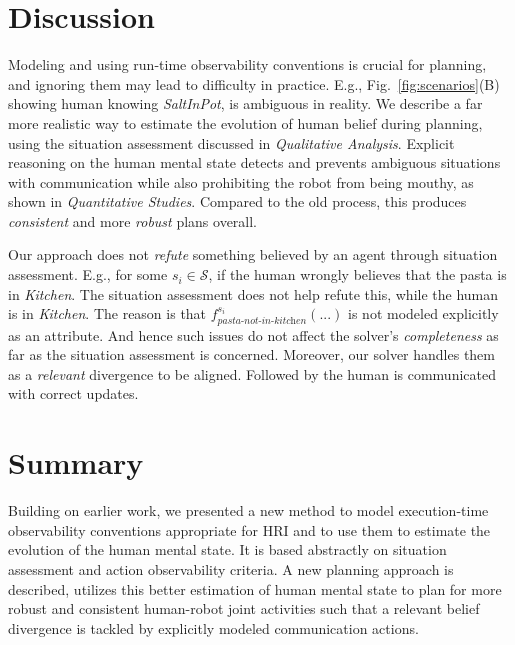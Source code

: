 \documentclass[letterpaper]{article} %
\begin{document}
\section{Discussion}
Modeling and using run-time observability conventions is crucial for planning, and ignoring them may lead to difficulty in practice. 
E.g., Fig.~\ref{fig:scenarios}(B) showing human knowing \textit{SaltInPot}, is ambiguous in reality. We describe a far more realistic way to estimate the evolution of human belief during planning, using the situation assessment discussed in \textit{Qualitative Analysis}. Explicit reasoning on the human mental state detects and prevents ambiguous situations with communication while also prohibiting the robot from being mouthy, as shown in \textit{Quantitative Studies}. 
Compared to the old process, this produces \textit{consistent} and more \textit{robust} plans overall.

Our approach does not \textit{refute} something believed by an agent through situation assessment. 
E.g., for some $s_i \in \mathcal{S}$, if the human 
wrongly believes that the pasta is in \textit{Kitchen}. The situation assessment does not help refute this, while the human is in \textit{Kitchen}. 
The reason is that $f_{\textit{pasta-not-in-kitchen}}^{s_i}(...)$ is not modeled explicitly as an attribute. 
And hence such issues do not affect the solver's \textit{completeness} as far as the situation assessment is concerned. Moreover, our solver handles them as a \textit{relevant} divergence to be aligned. Followed by the human is communicated with correct updates.

\section{Summary} 
Building on earlier work, we presented a new method to model execution-time observability conventions appropriate for HRI and to use them to estimate the evolution of the human mental state. It is based abstractly on situation assessment and action observability criteria. 
A new planning approach is described, utilizes this better estimation of human mental state to plan for more robust and consistent human-robot joint activities such that a relevant belief divergence is tackled by explicitly modeled communication actions. 
\end{document}
